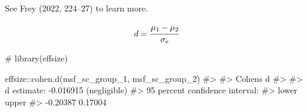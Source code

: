 \documentclass[
  12pt,
  a4paper,
  oneside]{tesesusp}
\newenvironment{Shaded}{\begin{snugshade}}{\end{snugshade}}
\newcommand{\CommentTok}[1]{\textcolor[rgb]{0.37,0.37,0.37}{#1}}
\newcommand{\FunctionTok}[1]{\textcolor[rgb]{0.28,0.35,0.67}{#1}}
\newcommand{\NormalTok}[1]{\textcolor[rgb]{0.00,0.23,0.31}{#1}}
\newcommand{\SpecialCharTok}[1]{\textcolor[rgb]{0.37,0.37,0.37}{#1}}
\begin{document}
See Frey (2022, 224--27) to learn more.

\[
d = \cfrac{\mu_{1} - \mu_{2}}{\sigma_{e}}
\]

\begin{Shaded}
\begin{Highlighting}[numbers=left,,]
\CommentTok{\# library(effsize)}

\NormalTok{effsize}\SpecialCharTok{::}\FunctionTok{cohen.d}\NormalTok{(msf\_sc\_group\_1, msf\_sc\_group\_2)}
\CommentTok{\#\textgreater{} }
\CommentTok{\#\textgreater{} Cohen\textquotesingle{}s d}
\CommentTok{\#\textgreater{} }
\CommentTok{\#\textgreater{} d estimate: {-}0.016915 (negligible)}
\CommentTok{\#\textgreater{} 95 percent confidence interval:}
\CommentTok{\#\textgreater{}    lower    upper }
\CommentTok{\#\textgreater{} {-}0.20387  0.17004}
\end{Highlighting}
\end{Shaded}
\end{document}
